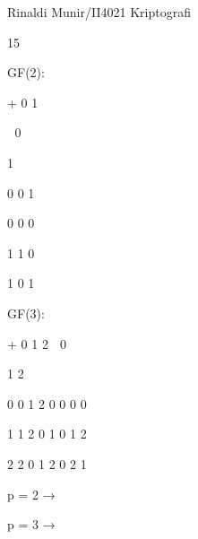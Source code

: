 \documentclass{article}
\begin{document}

Rinaldi Munir/II4021 Kriptografi

15

GF(2):

   +    0    1 


       0 

 1    

  0    0    1 


   0    0    0    

  1    1    0 


   1    0    1   

GF(3):

   +    0    1    2            0 

1   2

  0    0    1    2        0    0   0   0

  1    1    2    0        1    0   1   2

  2    2    0    1        2    0   2   1  

p = 2 → 

p = 3 →
\end{document}
